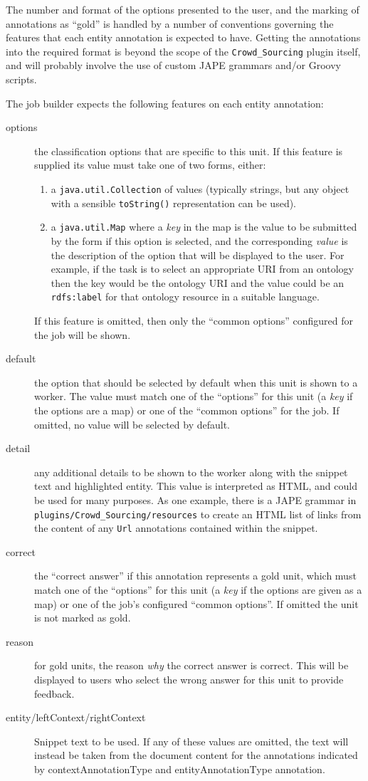 The number and format of the options presented to the user, and the marking of
annotations as ``gold'' is handled by a number of conventions governing the
features that each entity annotation is expected to have.  Getting the
annotations into the required format is beyond the scope of the
\verb!Crowd_Sourcing! plugin itself, and will probably involve the use of
custom JAPE grammars and/or Groovy scripts.

The job builder expects the following features on each entity annotation:
\begin{description}
\item[options] the classification options that are specific to this unit.  If
  this feature is supplied its value must take one of two forms, either:
  \begin{enumerate}
  \item a \verb!java.util.Collection! of values (typically strings, but any
    object with a sensible \verb!toString()! representation can be used).
  \item a \verb!java.util.Map! where a \emph{key} in the map is the value to be
    submitted by the form if this option is selected, and the corresponding
    \emph{value} is the description of the option that will be displayed to the
    user.  For example, if the task is to select an appropriate URI from an
    ontology then the key would be the ontology URI and the value could be an
    \verb!rdfs:label! for that ontology resource in a suitable language.
  \end{enumerate}
  If this feature is omitted, then only the ``common options'' configured for
  the job will be shown.
\item[default] the option that should be selected by default when this unit is
  shown to a worker.  The value must match one of the ``options'' for this
  unit (a \emph{key} if the options are a map) or one of the ``common options''
  for the job.  If omitted, no value will be selected by default.
\item[detail] any additional details to be shown to the worker along with the
  snippet text and highlighted entity.  This value is interpreted as HTML, and
  could be used for many purposes.  As one example, there is a JAPE grammar in
  \texttt{plugins/Crowd\_Sourcing/resources} to create an HTML list of links
  from the content of any \verb!Url! annotations contained within the snippet.
\item[correct] the ``correct answer'' if this annotation represents a gold
  unit, which must match one of the ``options'' for this unit (a \emph{key} if
  the options are given as a map) or one of the job's configured ``common
  options''.  If omitted the unit is not marked as gold.
\item[reason] for gold units, the reason \emph{why} the correct answer is
  correct.  This will be displayed to users who select the wrong answer for
  this unit to provide feedback.
\item[entity/leftContext/rightContext] Snippet text to be used. If any of 
  these values are omitted, the text will instead be taken from the document
  content for the annotations indicated by contextAnnotationType and 
  entityAnnotationType annotation.


\end{description}
